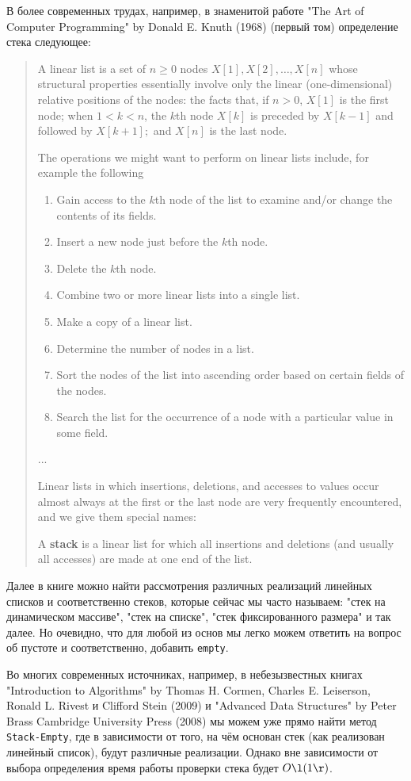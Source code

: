 В более современных трудах, например, в знаменитой работе "The Art of Computer Programming" by Donald E. Knuth (1968) (первый том) определение стека следующее:
\begin{quotation}
  A linear list is a set of \(n \geq 0\) nodes \(X[1], X[2], \dots , X[n]\) whose structural properties essentially involve only the linear (one-dimensional) relative positions of the nodes: the facts that, if \(n > 0\), \(X[1]\) is the first node; when \(1 < k < n\), the \(k\)th node \(X[k]\) is preceded by \(X[k - 1]\) and followed by \(X[k + 1];\) and \(X[n]\) is the last node.

The operations we might want to perform on linear lists include, for example the following
\begin{enumerate}
  \item Gain access to the \(k\)th node of the list to examine and/or change the contents of its fields.
  \item Insert a new node just before the \(k\)th node.
  \item Delete the \(k\)th node.
  \item Combine two or more linear lists into a single list.
  \item Make a copy of a linear list.
  \item Determine the number of nodes in a list.
  \item Sort the nodes of the list into ascending order based on certain fields of the nodes.
  \item Search the list for the occurrence of a node with a particular value in some field.
\end{enumerate}
...

Linear lists in which insertions, deletions, and accesses to values occur almost always at the first or the last node are very frequently encountered, and we give them special names:
  
A \textbf{stack} is a linear list for which all insertions and deletions (and usually all accesses) are made at one end of the list.
\end{quotation}
Далее в книге можно найти рассмотрения различных реализаций линейных списков и соответственно стеков, которые сейчас мы часто называем: "стек на динамическом массиве", "стек на списке", "стек фиксированного размера" и так далее. Но очевидно, что для любой из основ мы легко можем ответить на вопрос об пустоте и соответственно, добавить \texttt{empty}.

Во многих современных источниках, например, в небезызвестных книгах "Introduction to Algorithms" by Thomas H. Cormen, Charles E. Leiserson, Ronald L. Rivest и Clifford Stein (2009) и "Advanced Data Structures" by Peter Brass
Cambridge University Press (2008) мы можем уже прямо найти метод \texttt{Stack-Empty}, где в зависимости от того, на чём основан стек (как реализован линейный список), будут различные реализации. Однако вне зависимости от выбора определения время работы проверки стека будет \(O\l(1\r)\).

